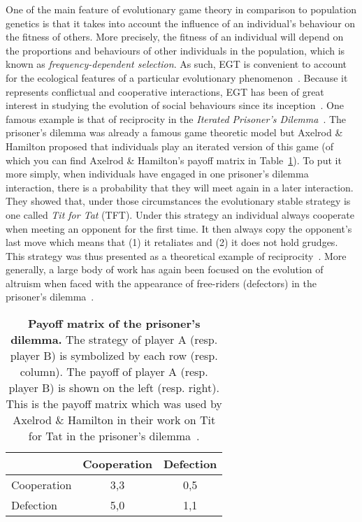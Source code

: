     One of the main feature of evolutionary game theory in comparison to population genetics is that it takes into account the influence of an individual's behaviour on the fitness of others. More precisely, the fitness of an individual will depend on the proportions and behaviours of other individuals in the population, which is known as \emph{frequency-dependent selection}. As such, EGT is convenient to account for the ecological features of a particular evolutionary phenomenon~\parencite{Hammerstein1994}. Because it represents conflictual and cooperative interactions, EGT has been of great interest in studying the evolution of social behaviours since its inception~\parencite{Bshary2015}. One famous example is that of reciprocity in the \emph{Iterated Prisoner's Dilemma}~\parencite{Axelrod1984}. The prisoner's dilemma was already a famous game theoretic model but Axelrod \& Hamilton proposed that individuals play an iterated version of this game (of which you can find Axelrod \& Hamilton's payoff matrix in Table~\ref{table:payoffIPD}). To put it more simply, when individuals have engaged in one prisoner's dilemma interaction, there is a probability that they will meet again in a later interaction. They showed that, under those circumstances the evolutionary stable strategy is one called \emph{Tit for Tat} (TFT). Under this strategy an individual always cooperate when meeting an opponent for the first time. It then always copy the opponent's last move which means that (1) it retaliates and (2) it does not hold grudges. This strategy was thus presented as a theoretical example of reciprocity~\parencite{Trivers1971}. More generally, a large body of work has again been focused on the evolution of altruism when faced with the appearance of free-riders (defectors) in the prisoner's dilemma~\parencite{Requejo2013a}.


    \begin{table}[ht]
    \centering
      \begin{tabular}{l|c|c}
        & Cooperation & Defection \\
        \hline
        Cooperation & 3,3 & 0,5 \\
        \hline
        Defection & 5,0 & 1,1 \\
        \hline
      \end{tabular}
      \caption{\textbf{Payoff matrix of the prisoner's dilemma.}
      The strategy of player A (resp. player B) is symbolized by each row (resp. column). The payoff of player A (resp. player B) is shown on the left (resp. right). This is the payoff matrix which was used by Axelrod \& Hamilton in their work on Tit for Tat in the prisoner's dilemma~\parencite{Axelrod1984}.}
    \label{table:payoffIPD}
    \end{table}


